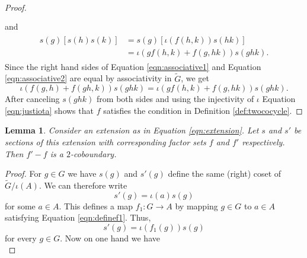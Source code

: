 \documentclass{dcthesis}
\newcommand{\mm}[1]{{\color{blue} \sf MM: [#1]}}
\newcommand{\wt}[1]{\widetilde{#1}}
\numberwithin{equation}{section}
\newtheorem{lemma}[equation]{Lemma}
\theoremstyle{definition}
\theoremstyle{remark}
\begin{document}
{{\begin{proof}
\begin{align}
\begin{split}
        \end{split}
      \end{align}
      and
      \begin{align}
        \label{eqn:associative2}
        \begin{split}
          s(g)[s(h)s(k)] &= s(g)[\iota(f(h,k))s(hk)]\\
                         &= \iota(gf(h,k)+f(g,hk))s(ghk).
        \end{split}
      \end{align}
      Since the right hand sides of Equation
      \ref{eqn:associative1}
      and
      Equation
      \ref{eqn:associative2}
      are equal
      by associativity in $\wt{G}$,
      we get
      \begin{equation}
        \label{eqn:justiota}
        \iota(f(g,h)+f(gh,k))s(ghk)
        =
        \iota(gf(h,k)+f(g,hk))s(ghk).
      \end{equation}
      After canceling $s(ghk)$ from both sides
      and using the injectivity of $\iota$
      Equation \ref{eqn:justiota}
      shows that $f$ satisfies the condition in
      Definition
      \ref{def:twococycle}.
    \end{proof}
    \begin{lemma}
      \label{lem:choiceofsectioncoboundary}
      Consider an extension as in Equation \ref{eqn:extension}.
      Let $s$ and $s'$ be sections of this extension
      with corresponding factor sets $f$ and $f'$
      respectively.
      Then $f'-f$ is a $2$-coboundary.
    \end{lemma}
    \begin{proof}
      For $g\in G$ we have
      $s(g)$ and $s'(g)$ define the same (right) coset of
      $\wt{G}/\iota(A)$.
      We can therefore write
      \begin{equation}
        \label{eqn:definef1}
        s'(g) = \iota(a)s(g)
      \end{equation}
      for some $a\in A$.
      This defines a map
      $f_1\colon G\to A$
      by mapping $g\in G$ to $a\in A$
      satisfying
      Equation \ref{eqn:definef1}.
      Thus,
      \begin{equation}
        \label{eqn:definef1again}
        s'(g)=\iota(f_1(g))s(g)
      \end{equation}
      for every $g\in G$.
      Now on one hand we have
      \begin{equation}

\end{equation}
\end{proof}}}
\end{document}
